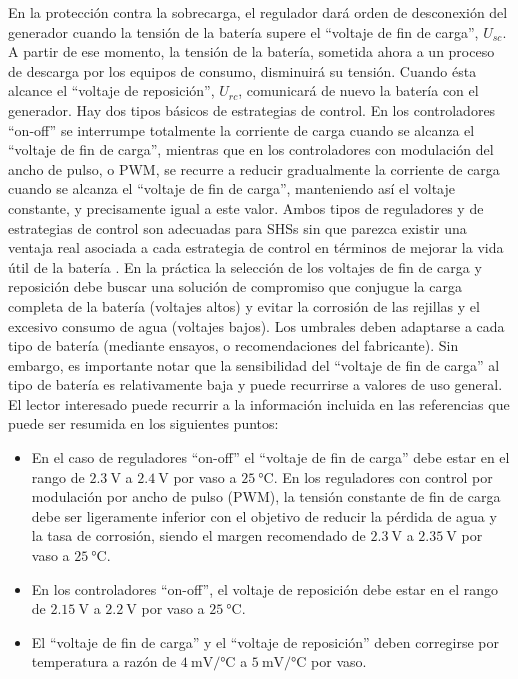 En la protección contra la sobrecarga, el regulador dará orden de
desconexión del generador cuando la tensión de la batería supere el
{}``voltaje de fin de carga'', $U_{sc}$.
A partir de ese momento, la tensión de la batería, sometida ahora
a un proceso de descarga por los equipos de consumo, disminuirá su
tensión. Cuando ésta alcance el {}``voltaje de reposición'', $U_{rc}$,
comunicará de nuevo la batería con el generador. Hay dos tipos básicos
de estrategias de control. En los controladores {}``on-off'' se
interrumpe totalmente la corriente de carga cuando se alcanza el \textquotedblleft{}voltaje
de fin de carga\textquotedblright{}, mientras que en los controladores
con \textquotedbl{}modulación del ancho de pulso\textquotedbl{}, o
PWM, se recurre a reducir gradualmente la corriente de carga cuando
se alcanza el \textquotedblleft{}voltaje de fin de carga\textquotedblright{},
manteniendo así el voltaje constante, y precisamente igual a este
valor. Ambos tipos de reguladores y de estrategias de control son
adecuadas para SHSs sin que parezca existir una ventaja real asociada
a cada estrategia de control en términos de mejorar la vida útil de
la batería \cite{Egido.Lorenzo1998}. En la práctica la selección
de los voltajes de fin de carga y reposición debe buscar una solución
de compromiso que conjugue la carga completa de la batería (voltajes
altos) y evitar la corrosión de las rejillas y el excesivo consumo
de agua (voltajes bajos). Los umbrales deben adaptarse a cada tipo
de batería (mediante ensayos, o recomendaciones del fabricante). Sin
embargo, es importante notar que la sensibilidad del \textquotedblleft{}voltaje
de fin de carga\textquotedblright{} al tipo de batería es relativamente
baja y puede recurrirse a valores de uso general. El lector interesado
puede recurrir a la información incluida en las referencias \cite{Egido.Lorenzo1998,Usher.Ross1998}
que puede ser resumida en los siguientes puntos:
\begin{itemize}
\item En el caso de reguladores {}``on-off'' el \textquotedblleft{}voltaje
de fin de carga\textquotedblright{} debe estar en el rango de $\SI{2.3}{\volt}$
a $\SI{2.4}{\volt}$ por vaso a $\SI{25}{\celsius}$. En los reguladores
con control por modulación por ancho de pulso (PWM), la tensión constante
de fin de carga debe ser ligeramente inferior con el objetivo de reducir
la pérdida de agua y la tasa de corrosión, siendo el margen recomendado
de $\SI{2.3}{\volt}$ a $\SI{2.35}{\volt}$ por vaso a $\SI{25}{\celsius}$.
\item En los controladores \textquotedblleft{}on-off\textquotedblright{},
el voltaje de reposición debe estar en el rango de $\SI{2.15}{\volt}$
a $\SI{2.2}{\volt}$ por vaso a $\SI{25}{\celsius}$. 
\item El \textquotedblleft{}voltaje de fin de carga\textquotedblright{}
y el \textquotedblleft{}voltaje de reposición\textquotedblright{}
deben corregirse por temperatura a razón de $\SI{4}{\milli\volt\per\celsius}$
a $\SI{5}{\milli\volt\per\celsius}$ por vaso.
\end{itemize}
